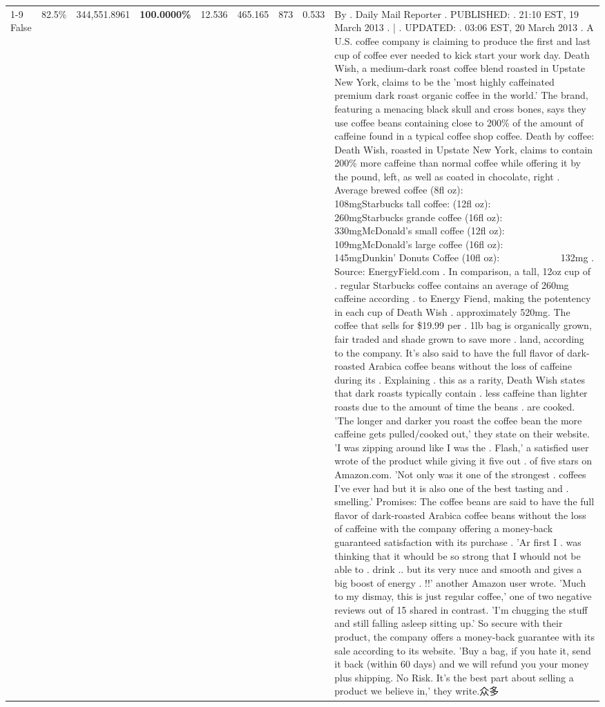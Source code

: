 \begin{table}[H]
{\begin{tabular}{lllrlllll}
\cline{1-9}
False & 82.5\% & 344,551.8961 & \bfseries \color{red} 100.0000\% & 12.536 & 465.165 & 873 & 0.533 & By . Daily Mail Reporter . PUBLISHED: . 21:10 EST, 19 March 2013 . | . UPDATED: . 03:06 EST, 20 March 2013 . A U.S. coffee company is claiming to produce the first and last cup of coffee ever needed to kick start your work day. Death Wish, a medium-dark roast coffee blend roasted in Upstate New York, claims to be the 'most highly caffeinated premium dark roast organic coffee in the world.' The brand, featuring a menacing black skull and cross bones, says they use coffee beans containing close to 200\% of the amount of caffeine found in a typical coffee shop coffee. Death by coffee: Death Wish, roasted in Upstate New York, claims to contain 200\% more caffeine than normal coffee while offering it by the pound, left, as well as coated in chocolate, right . Average brewed coffee (8fl oz):              108mgStarbucks tall coffee: (12fl oz):                260mgStarbucks grande coffee (16fl oz):         330mgMcDonald's small coffee (12fl oz):           109mgMcDonald's large coffee (16fl oz):           145mgDunkin' Donuts Coffee (10fl oz):             132mg . Source: EnergyField.com . In comparison, a tall, 12oz cup of . regular Starbucks coffee contains an average of 260mg caffeine according . to Energy Fiend, making the potentency in each cup of Death Wish . approximately 520mg. The coffee that sells for \$19.99 per . 1lb bag is organically grown, fair traded and shade grown to save more . land, according to the company. It's also said to have the full flavor of dark-roasted Arabica coffee beans without the loss of caffeine during its . Explaining . this as a rarity, Death Wish states that dark roasts typically contain . less caffeine than lighter roasts due to the amount of time the beans . are cooked. 'The longer and darker you roast the coffee bean the more caffeine gets pulled/cooked out,' they state on their website. 'I was zipping around like I was the . Flash,' a satisfied user wrote of the product while giving it five out . of five stars on Amazon.com. 'Not only was it one of the strongest . coffees I've ever had but it is also one of the best tasting and . smelling.’ Promises: The coffee beans are said to have the full flavor of dark-roasted Arabica coffee beans without the loss of caffeine with the company offering a money-back guaranteed satisfaction with its purchase . 'Ar first I . was thinking that it whould be so strong that I whould not be able to . drink .. but its very nuce and smooth and gives a big boost of energy . !!' another Amazon user wrote. 'Much to my dismay, this is just regular coffee,' one of two negative reviews out of 15 shared in contrast. 'I'm chugging the stuff and still falling asleep sitting up.' So secure with their product, the company offers a money-back guarantee with its sale according to its website. 'Buy a bag, if you hate it, send it back (within 60 days) and we will refund you your money plus shipping. No Risk. It’s the best part about selling a product we believe in,' they write.众多 \\

\end{tabular}}
\end{table}
